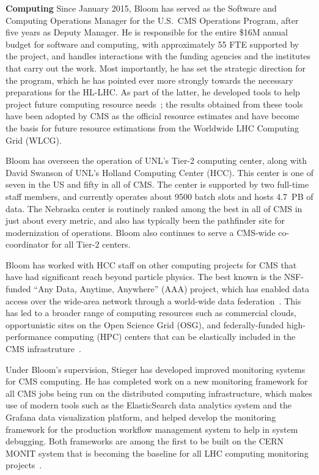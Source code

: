 {\bf Computing} Since January 2015, Bloom has served as the Software and
Computing Operations Manager for the U.S.~CMS Operations Program, after
five years as Deputy Manager.  He is responsible for the entire \$16M
annual budget for software and computing, with approximately 55 FTE
supported by the project, and handles interactions with the funding
agencies and the institutes that carry out the work.  Most importantly, he
has set the strategic direction for the program, which he has pointed ever
more strongly towards the necessary preparations for the HL-LHC.  As part
of the latter, he developed tools to help project future computing resource
needs~\cite{bib:resource-modeling}; the results obtained from these tools
have been adopted by CMS as the official resource estimates and have
become the basis for future resource estimations from the Worldwide LHC
Computing Grid (WLCG).

Bloom has overseen the operation of UNL's Tier-2 computing center, along with David Swanson of UNL's Holland Computing Center (HCC). This center is one of seven in the US and fifty in all of CMS. The center is supported by two full-time staff members, and currently operates about 9500 batch slots and hosts 4.7~PB of data. The Nebraska center is routinely ranked among the best in all of CMS in just about every metric, and also has typically been the pathfinder site for modernization of operations. Bloom also continues to serve a CMS-wide co-coordinator for all Tier-2 centers.

Bloom has worked with HCC staff on other computing projects for CMS that have had significant reach beyond particle physics.  The best known is the NSF-funded ``Any Data, Anytime, Anywhere'' (AAA) project, which has enabled data access over the wide-area network through a world-wide data federation~\cite{bib:AAA}.  This has led to a broader range of computing resources such as commercial clouds, opportunistic sites on the Open Science Grid (OSG), and federally-funded high-performance computing (HPC) centers that can be elastically included in the CMS infrastruture~\cite{bib:hepcloud}.

Under Bloom's supervision, Stieger has developed improved monitoring systems for CMS computing. He has completed work on a new monitoring framework for all CMS jobs being run on the distributed computing infrastructure, which makes use of modern tools such as the ElasticSearch data analytics system and the Grafana data visualization platform, and helped develop the monitoring framework for the production workflow management system to help in system debugging.  Both frameworks are among the first to be built on the CERN MONIT system that is becoming the baseline for all LHC computing monitoring projects~\cite{bib:MONIT}.

